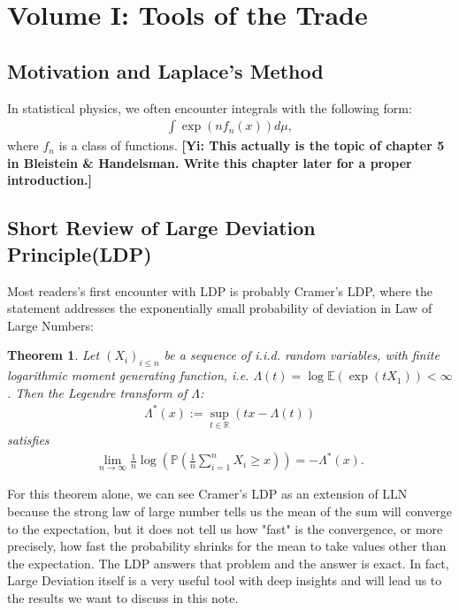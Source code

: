 \documentclass[10pt]{article}
\newcommand{\e}{\mathbb{E}}
\newcommand{\p}{\mathbb{P}}
\newcommand{\gy}[1]{\textbf{\color{red}[Yi: #1]}}
\newtheorem{theorem}{\bf Theorem}
\newenvironment{Proof of lemma}{\noindent{\bf Proof of Lemma}}{\hfill$\Box$\newline}
\newenvironment{Proof of claim}{\noindent{\bf Proof of claim}}{\hfill$\Box$\newline}
\newenvironment{Proof of theorem}{\noindent{\bf Proof of Theorem}}{\hfill\scriptsize{$\Box$}\newline}
\newenvironment{Proof of theorems}{\noindent{\bf Proof of Theorems}}{\hfill$\Box$\newline}
\newenvironment{Proof of proposition}{\noindent{\bf Proof of Proposition}}{\hfill$\Box$\newline}
\newenvironment{Proof of propositions}{\noindent{\bf Proof of Propositions}}{\hfill$\Box$\newline}
\newenvironment{Proof of exercise}{\noindent{\it Proof of Exercise:}}{\hfill$\Box$}
\numberwithin{equation}{section}
\begin{document}
\section{Volume I: Tools of the Trade}

\subsection{Motivation and Laplace's Method}
In statistical physics, we often encounter integrals with the following form:
\begin{align}
    \int \exp(nf_n(x))d\mu,
\end{align}
where $f_n$ is a class of functions. \gy{This actually is the topic of chapter 5 in Bleistein \& Handelsman. Write this chapter later for a proper introduction.}

\subsection{Short Review of Large Deviation Principle(LDP)}
Most readers's first encounter with LDP is probably Cramer's LDP, where the statement addresses the exponentially small probability of deviation in Law of Large Numbers:
\begin{theorem}
    Let $(X_i)_{i \leq n}$ be a sequence of i.i.d. random variables, with finite logarithmic moment generating function, i.e. $\Lambda(t) = \log \e(\exp (tX_1)) < \infty$. Then the Legendre transform of $\Lambda$:
    \begin{align} \label{cramer_rate}
        \Lambda^{\ast} (x):= \sup_{t \in \mathbb{R}}(tx - \Lambda(t))
    \end{align}
    satisfies
    \begin{align} \label{cramer_ldp}
        \lim_{n \to \infty} \frac{1}{n} \log \left(\p \left(\frac{1}{n}\sum_{i=1}^n X_i \geq x\right)\right) = -\Lambda^{\ast}(x).
    \end{align}
\end{theorem}
For this theorem alone, we can see Cramer's LDP as an extension of LLN because the strong law of large number tells us the mean of the sum will converge to the expectation, but it does not tell us how "fast" is the convergence, or more precisely, how fast the probability shrinks for the mean to take values other than the expectation. The LDP answers that problem and the answer is exact. In fact, Large Deviation itself is a very useful tool with deep insights and will lead us to the results we want to discuss in this note.
\end{document}
